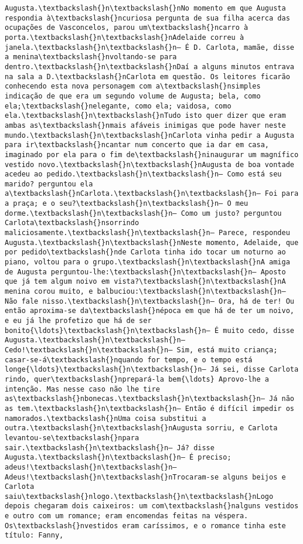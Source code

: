 \documentclass[11pt]{article}
\begin{document}
\begin{Verbatim}[commandchars=\\\{\}]
Augusta.\textbackslash{}n\textbackslash{}nNo momento em que Augusta respondia à\textbackslash{}ncuriosa pergunta de sua filha acerca das ocupações de Vasconcelos, parou um\textbackslash{}ncarro à porta.\textbackslash{}n\textbackslash{}nAdelaide correu à janela.\textbackslash{}n\textbackslash{}n— É D. Carlota, mamãe, disse a menina\textbackslash{}nvoltando-se para dentro.\textbackslash{}n\textbackslash{}nDaí a alguns minutos entrava na sala a D.\textbackslash{}nCarlota em questão. Os leitores ficarão conhecendo esta nova personagem com a\textbackslash{}nsimples indicação de que era um segundo volume de Augusta; bela, como ela;\textbackslash{}nelegante, como ela; vaidosa, como ela.\textbackslash{}n\textbackslash{}nTudo isto quer dizer que eram ambas as\textbackslash{}nmais afáveis inimigas que pode haver neste mundo.\textbackslash{}n\textbackslash{}nCarlota vinha pedir a Augusta para ir\textbackslash{}ncantar num concerto que ia dar em casa, imaginado por ela para o fim de\textbackslash{}ninaugurar um magnífico vestido novo.\textbackslash{}n\textbackslash{}nAugusta de boa vontade acedeu ao pedido.\textbackslash{}n\textbackslash{}n— Como está seu marido? perguntou ela a\textbackslash{}nCarlota.\textbackslash{}n\textbackslash{}n— Foi para a praça; e o seu?\textbackslash{}n\textbackslash{}n— O meu dorme.\textbackslash{}n\textbackslash{}n— Como um justo? perguntou Carlota\textbackslash{}nsorrindo maliciosamente.\textbackslash{}n\textbackslash{}n— Parece, respondeu Augusta.\textbackslash{}n\textbackslash{}nNeste momento, Adelaide, que por pedido\textbackslash{}nde Carlota tinha ido tocar um noturno ao piano, voltou para o grupo.\textbackslash{}n\textbackslash{}nA amiga de Augusta perguntou-lhe:\textbackslash{}n\textbackslash{}n— Aposto que já tem algum noivo em vista?\textbackslash{}n\textbackslash{}nA menina corou muito, e balbuciou:\textbackslash{}n\textbackslash{}n— Não fale nisso.\textbackslash{}n\textbackslash{}n— Ora, há de ter! Ou então aproxima-se da\textbackslash{}népoca em que há de ter um noivo, e eu já lhe profetizo que há de ser bonito{\ldots}\textbackslash{}n\textbackslash{}n— É muito cedo, disse Augusta.\textbackslash{}n\textbackslash{}n— Cedo!\textbackslash{}n\textbackslash{}n— Sim, está muito criança; casar-se-á\textbackslash{}nquando for tempo, e o tempo está longe{\ldots}\textbackslash{}n\textbackslash{}n— Já sei, disse Carlota rindo, quer\textbackslash{}nprepará-la bem{\ldots} Aprovo-lhe a intenção. Mas nesse caso não lhe tire as\textbackslash{}nbonecas.\textbackslash{}n\textbackslash{}n— Já não as tem.\textbackslash{}n\textbackslash{}n— Então é difícil impedir os namorados.\textbackslash{}nUma coisa substitui a outra.\textbackslash{}n\textbackslash{}nAugusta sorriu, e Carlota levantou-se\textbackslash{}npara sair.\textbackslash{}n\textbackslash{}n— Já? disse Augusta.\textbackslash{}n\textbackslash{}n— É preciso; adeus!\textbackslash{}n\textbackslash{}n— Adeus!\textbackslash{}n\textbackslash{}nTrocaram-se alguns beijos e Carlota saiu\textbackslash{}nlogo.\textbackslash{}n\textbackslash{}nLogo depois chegaram dois caixeiros: um com\textbackslash{}nalguns vestidos e outro com um romance; eram encomendas feitas na véspera. Os\textbackslash{}nvestidos eram caríssimos, e o romance tinha este título: Fanny, 
\end{Verbatim}
\end{document}
